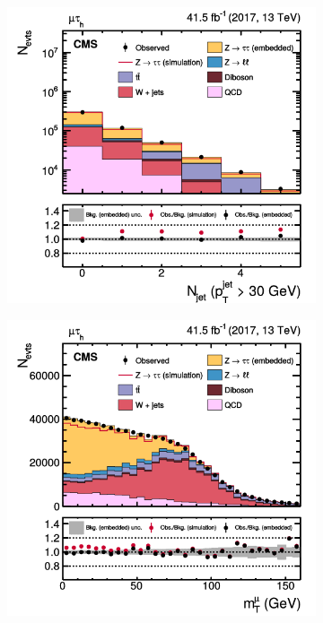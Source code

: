 \begin{figure}[!ht]
  \begin{subfigure}[b]{0.33\linewidth}
    \centering
    \includegraphics[width=\linewidth]{Chapitre4/Images/Njets_embed.png} 
    \caption*{} 
    \vspace{0.5ex}
  \end{subfigure}%
  \begin{subfigure}[b]{0.33\linewidth}
    \centering
    \includegraphics[width=\linewidth]{Chapitre4/Images/mtmu_embed.png} 

\end{subfigure}
\end{figure}
